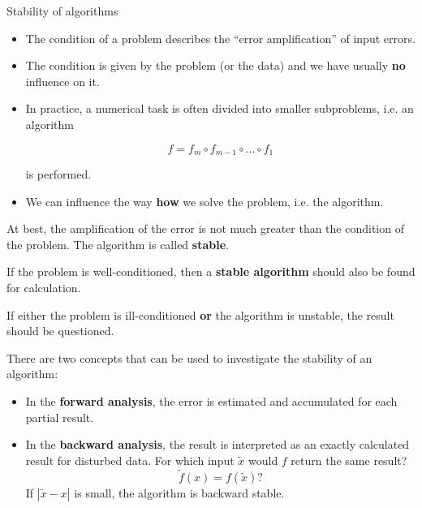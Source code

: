 








\begin{vbframe}{Stability of algorithms}

\begin{itemize}
\item The condition of a problem describes the \enquote{error amplification} of input errors.
\item The condition is given by the problem (or the data) and we have usually \textbf{no} influence on it.
\item In practice, a numerical task is often divided into smaller subproblems, i.e. an algorithm

$$
f = f_m \circ f_{m-1} \circ ... \circ f_1
$$

is performed.
\item We can influence the way \textbf{how} we solve the problem, i.e. the algorithm.
\end{itemize}

\framebreak

At best, the amplification of the error is not much greater than the condition of the problem. The algorithm is called \textbf{stable}.

\lz

If the problem is well-conditioned, then a \textbf{stable algorithm} should also be found for calculation.

\lz

If either the problem is ill-conditioned \textbf{or} the algorithm is unstable, the result should be questioned.

\framebreak

There are two concepts that can be used to investigate the stability of an algorithm:

\begin{itemize}
\item In the \textbf{forward analysis}, the error is estimated and accumulated for each partial result.
\item In the \textbf{backward analysis}, the result is interpreted as an exactly calculated result for disturbed data. For which input $\tilde x$ would $f$ return the same result?
$$
\tilde f(x) = f(\tilde x)?
$$
If $|\tilde x - x|$ is small, the algorithm is backward stable.
\end{itemize}


\end{vbframe}

